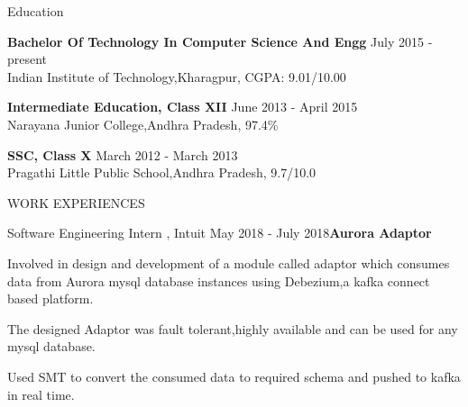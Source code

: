 \documentclass{resume} %
\begin{document}
  


\begin{rSection}{Education}

{\bf Bachelor Of Technology In Computer Science And Engg} \hfill {July 2015 - present}
\\ 
Indian Institute of Technology,Kharagpur, CGPA: 9.01/10.00   

{\bf Intermediate Education, Class XII} \hfill {June 2013 - April 2015}
\\ 
Narayana Junior College,Andhra Pradesh, 97.4\%

{\textbf{SSC, Class X}}  \hfill{March 2012 - March 2013}\\
Pragathi Little Public School,Andhra Pradesh, 9.7/10.0    


\end{rSection} 

  
\begin{rSection}{WORK EXPERIENCES}

\begin{rSubsection}{Software Engineering Intern , Intuit }{May 2018 - July 2018}{\textbf{Aurora Adaptor}}{}              
\item Involved in design and development of a module called adaptor which consumes data from Aurora mysql database instances using
Debezium,a kafka connect based platform.
\item The designed Adaptor was fault tolerant,highly available and can be used for any mysql database. 
\item Used SMT to convert  the consumed data to required schema and pushed to kafka in real time.
\end{rSubsection}  

\end{rSection}
\end{document}

